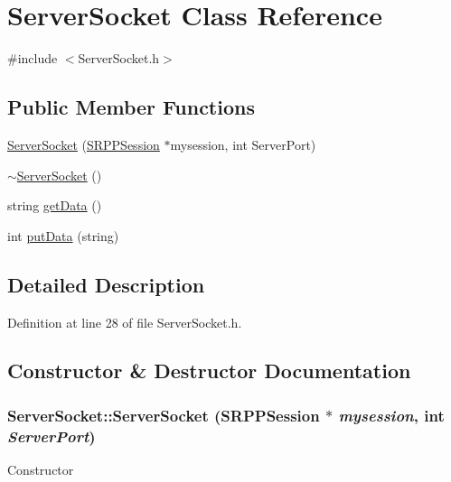 \hypertarget{class_server_socket}{
\section{ServerSocket Class Reference}
\label{class_server_socket}
}


{\ttfamily \#include $<$ServerSocket.h$>$}

\subsection*{Public Member Functions}
\begin{DoxyCompactItemize}
\item 
\hyperlink{class_server_socket_ad170691bca5aa15ee4e73990586d3d83}{ServerSocket} (\hyperlink{class_s_r_p_p_session}{SRPPSession} $\ast$mysession, int ServerPort)
\item 
\hyperlink{class_server_socket_a510674d924c2544e6b0069e39c36516b}{$\sim$ServerSocket} ()
\item 
string \hyperlink{class_server_socket_a0369ddedee48f15d9cedb1c46d424ab2}{getData} ()
\item 
int \hyperlink{class_server_socket_a11591e1eb5e51b3b199f846836486e13}{putData} (string)
\end{DoxyCompactItemize}


\subsection{Detailed Description}


Definition at line 28 of file ServerSocket.h.



\subsection{Constructor \& Destructor Documentation}
\hypertarget{class_server_socket_ad170691bca5aa15ee4e73990586d3d83}{
\subsubsection[{ServerSocket}]{\setlength{\rightskip}{0pt plus 5cm}ServerSocket::ServerSocket ({\bf SRPPSession} $\ast$ {\em mysession}, \/  int {\em ServerPort})}}
\label{class_server_socket_ad170691bca5aa15ee4e73990586d3d83}
Constructor 

